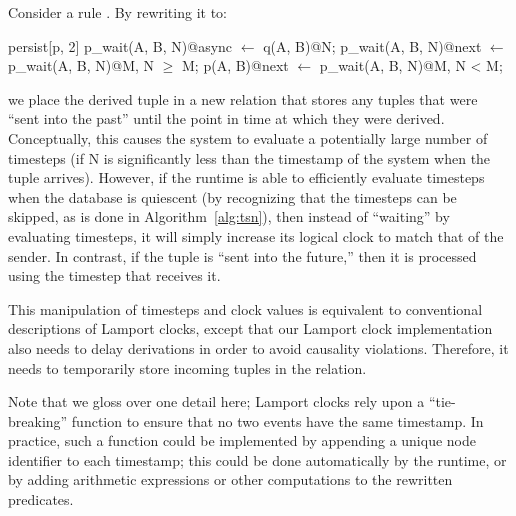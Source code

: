 Consider a rule .  By
rewriting it to:

\begin{Dedalus}
persist[p, 2]
p\_wait(A, B, N)@async \(\leftarrow\) q(A, B)@N;
p\_wait(A, B, N)@next \(\leftarrow\) p\_wait(A, B, N)@M, N \(\ge\) M;
p(A, B)@next \(\leftarrow\) p\_wait(A, B, N)@M, N < M;
\end{Dedalus}
\noindent
we place the derived tuple in a new relation  that
stores any tuples that were ``sent into the past'' until the point in
time at which they were derived.  Conceptually, this causes the system
to evaluate a potentially large number of timesteps (if N is
significantly less than the timestamp of the system when the tuple
arrives).  However, if the runtime is able to efficiently evaluate
timesteps when the database is quiescent (by recognizing that the
timesteps can be skipped, as is done in Algorithm~\ref{alg:tsn}), then
instead of ``waiting'' by evaluating timesteps, it will simply
increase its logical clock to match that of the sender.  In contrast,
if the tuple is ``sent into the future,'' then it is processed using
the timestep that receives it.

This manipulation of timesteps and clock values is equivalent to
conventional descriptions of Lamport clocks, except that our Lamport
clock implementation also needs to delay derivations in order to avoid causality
violations.  Therefore, it needs to temporarily store incoming tuples
in the  relation.

Note that we gloss over one detail here; Lamport clocks rely
upon a ``tie-breaking'' function to ensure that no two events have the
same timestamp.  In practice, such a function could be implemented by
appending a unique node identifier to each timestamp; this could be
done automatically by the runtime, or by adding arithmetic expressions
or other computations to the rewritten predicates.

